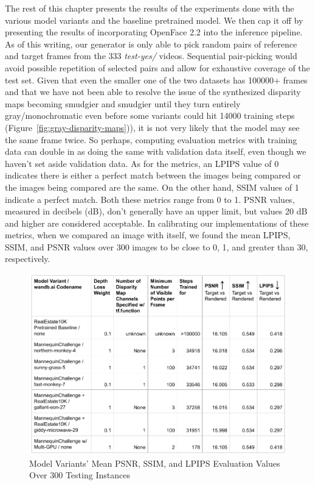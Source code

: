 The rest of this chapter presents the results of the experiments done with the various model variants and the baseline pretrained model. We then cap it off by presenting the results of incorporating OpenFace 2.2 into the inference pipeline. As of this writing, our generator is only able to pick random pairs of reference and target frames from the 333 \textit{test-yes/} videos. Sequential pair-picking would avoid possible repetition of selected pairs and allow for exhaustive coverage of the test set. Given that even the smaller one of the two datasets has 100000+ frames and that we have not been able to resolve the issue of the synthesized disparity maps becoming smudgier and smudgier until they turn entirely gray/monochromatic even before some variants could hit 14000 training steps (Figure~\ref{fig:gray-disparity-maps})), it is not very likely that the model may see the same frame twice. So perhaps, computing evaluation metrics with training data can double in as doing the same with validation data itself, even though we haven't set aside validation data. As for the metrics, an LPIPS value of 0 indicates there is either a perfect match between the images being compared or the images being compared are the same. On the other hand, SSIM values of 1 indicate a perfect match. Both these metrics range from 0 to 1. PSNR values, measured in decibels (dB), don't generally have an upper limit, but values 20 dB and higher are considered acceptable. In calibrating our implementations of these metrics, when we compared an image with itself, we found the mean LPIPS, SSIM, and PSNR values over 300 images to be close to 0, 1, and greater than 30, respectively.

\begin{figure}[!h]
    \includegraphics[width=1\columnwidth]{figures/model-variants-metrics.png}
    \caption{Model Variants' Mean PSNR, SSIM, and LPIPS Evaluation Values Over 300 Testing Instances}
    \label{fig:model-variants-metrics}
\end{figure}

